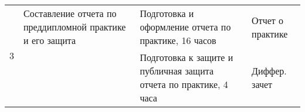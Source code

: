 \begin{table}[htp]
\begin{tabular}{|p{}|p{}|p{}|p{}|}
        \multirow{3}{*}{3} & Составление отчета по преддипломной практике и его защита \multirow{2}{*}{} & Подготовка и оформление отчета по практике, 16 часов                                               & Отчет о практике                 \\ \cline{3-4}
                           &                                                                             & Подготовка к защите и публичная защита отчета по практике, 4 часа                                  & Диффер. зачет                    \\ \hline
    \end{tabular}
    \label{plan}
\end{table}
